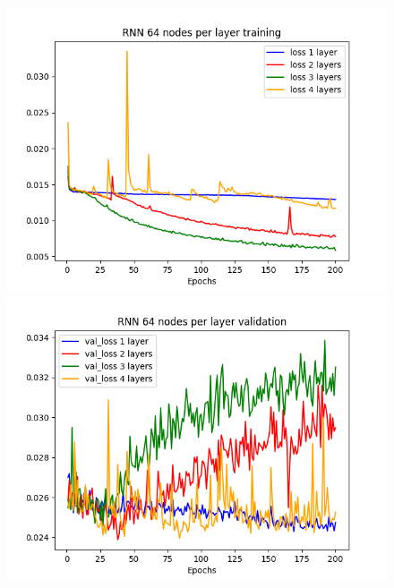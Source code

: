 \documentclass[11pt]
{article}
\begin{document}
\begin{figure}[H]
\hspace*{-2cm}  
	\begin{minipage}[b]{0.33\linewidth}
		\centering
		\includegraphics[width=\linewidth]{../TESTS_RESULTS/RNN_tests/plots/64_training.png} 
	\end{minipage}%
	\begin{minipage}[b]{0.33\linewidth}
		\centering
		\includegraphics[width=\linewidth]{../TESTS_RESULTS/RNN_tests/plots/64_validation.png} 
	\end{minipage} 
	\begin{minipage}[b]{0.33\linewidth}
		\centering

\end{minipage}
\end{figure}
\end{document}
